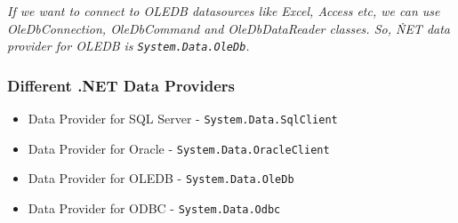 \emph{If we want to connect to OLEDB datasources like Excel, Access etc, we can use OleDbConnection, OleDbCommand and OleDbDataReader classes. So, \. NET data provider for OLEDB is \texttt{System.Data.OleDb}.}

\subsubsection*{Different .NET Data Providers}
\begin{itemize}
	\item Data Provider for SQL Server - \texttt{System.Data.SqlClient}
	\item Data Provider for Oracle - \texttt{System.Data.OracleClient}
	\item Data Provider for OLEDB - \texttt{System.Data.OleDb}
	\item Data Provider for ODBC - \texttt{System.Data.Odbc}
\end{itemize}


